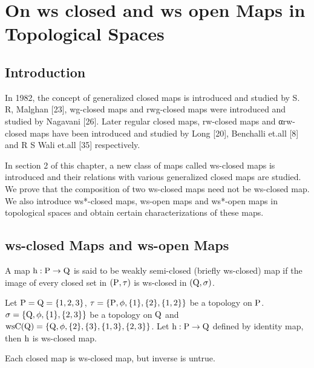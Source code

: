 \chapter{On ws closed and ws open Maps in Topological Spaces}
\graphicspath{{Chapter4/Chapter4Figs/EPS/}{Chapter4/Chapter4Figs/}}

\section{Introduction}\label{sec4.1}

In 1982, the concept of generalized closed maps is introduced and studied by S. R, Malghan [23], wg-closed maps and rwg-closed maps were introduced and studied by Nagavani [26]. Later regular closed maps, rw-closed maps and αrw-closed maps have been introduced and studied by Long [20], Benchalli et.all [8] and R S Wali et.all [35] respectively. 

In section 2 of this chapter, a new class of maps called ws-closed maps is introduced and their relations with various generalized closed maps are studied. We prove that the composition of two ws-closed maps need not be ws-closed map. We also introduce ws*-closed maps, ws-open maps and ws*-open maps in topological spaces and obtain certain characterizations of these maps.

\section{ws-closed Maps and ws-open Maps}\label{sec4.2}

\begin{dfn}\label{defi4.2.1} 
A map $\mathrm{h}: \mathrm{P} \to \mathrm{Q}$ is said to be weakly semi-closed (briefly ws-closed) map if the image of every closed set in $(\mathrm{P}, \tau)$ is ws-closed in $(\mathrm{Q}, \sigma)$.
\end{dfn}

\begin{exm}\label{exam4.2.2}
Let $\mathrm{P} = \mathrm{Q} = \{1, 2, 3\}$, $\tau = \{\mathrm{P}, \phi, \{1\}, \{2\}, \{1, 2\}\}$ be a topology on $\mathrm{P}$.
$\sigma = \{\mathrm{Q}, \phi, \{1\}, \{2, 3\}\}$ be a topology on $\mathrm{Q}$ and $\ws\TSC(\TSQ) =\{\TSQ, \phi, \{2\},\{3\},\{1,3\},\break \{2, 3\}\}$. Let $\mathrm{h}: \mathrm{P} \to \mathrm{Q}$ defined by identity map, then $\mathrm{h}$ is ws-closed map.
\end{exm}

\begin{thm}\label{thm4.2.3}
Each closed map is ws-closed map, but inverse is untrue.
\end{thm}

